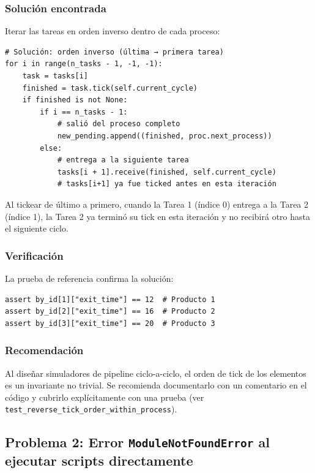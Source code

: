 \documentclass[12pt,letterpaper]{article}
\begin{document}
\subsubsection*{Solución encontrada}

Iterar las tareas en orden inverso dentro de cada proceso:

\begin{lstlisting}
# Solución: orden inverso (última → primera tarea)
for i in range(n_tasks - 1, -1, -1):
    task = tasks[i]
    finished = task.tick(self.current_cycle)
    if finished is not None:
        if i == n_tasks - 1:
            # salió del proceso completo
            new_pending.append((finished, proc.next_process))
        else:
            # entrega a la siguiente tarea
            tasks[i + 1].receive(finished, self.current_cycle)
            # tasks[i+1] ya fue ticked antes en esta iteración
\end{lstlisting}

Al tickear de último a primero, cuando la Tarea 1 (índice 0) entrega a la Tarea 2 (índice 1),
la Tarea 2 ya terminó su tick en esta iteración y no recibirá otro hasta el siguiente ciclo.

\subsubsection*{Verificación}

La prueba de referencia confirma la solución:
\begin{lstlisting}
assert by_id[1]["exit_time"] == 12  # Producto 1
assert by_id[2]["exit_time"] == 16  # Producto 2
assert by_id[3]["exit_time"] == 20  # Producto 3
\end{lstlisting}

\subsubsection*{Recomendación}

Al diseñar simuladores de pipeline ciclo-a-ciclo, el orden de tick de los elementos es
un invariante no trivial. Se recomienda documentarlo con un comentario en el código y
cubrirlo explícitamente con una prueba (ver \texttt{test\_reverse\_tick\_order\_within\_process}).

\vspace{0.8em}
\subsection{Problema 2: Error \texttt{ModuleNotFoundError} al ejecutar scripts directamente}
\end{document}

